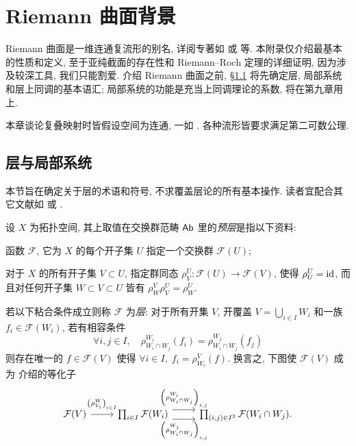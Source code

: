 
\chapter{Riemann 曲面背景}
Riemann 曲面是一维连通复流形的别名, 详阅专著如 \cite{Mei13} 或 \cite[第七章]{ChCh} 等. 本附录仅介绍最基本的性质和定义, 至于亚纯截面的存在性和 Riemann--Roch 定理的详细证明, 因为涉及较深工具, 我们只能割爱. 介绍 Riemann 曲面之前, \S\ref{sec:sheaves} 将先确定层, 局部系统和层上同调的基本语汇; 局部系统的功能是充当上同调理论的系数, 将在第九章用上.

本章谈论复叠映射时皆假设空间为连通, 一如 \cite[第五章]{You}. 各种流形皆要求满足第二可数公理.

\section{层与局部系统}\label{sec:sheaves}
本节旨在确定关于层的术语和符号, 不求覆盖层论的所有基本操作. 读者宜配合其它文献如 \cite[Chapter 2]{Di04} 或 \cite[第 3 章]{LZ}.

\begin{definition}
	设 $X$ 为拓扑空间, 其上取值在交换群范畴 $\mathsf{Ab}$ 里的\emph{预层}是指以下资料:
	\begin{compactitem}
		\item 函数 $\mathcal{F}$, 它为 $X$ 的每个开子集 $U$ 指定一个交换群 $\mathcal{F}(U)$;
		\item 对于 $X$ 的所有开子集 $V \subset U$, 指定群同态 $\rho^U_V: \mathcal{F}(U) \to \mathcal{F}(V)$, 使得 $\rho^U_U = \mathrm{id}$, 而且对任何开子集 $W \subset V \subset U$ 皆有 $\rho^V_W \rho^U_V = \rho^U_W$.
	\end{compactitem}
	若以下粘合条件成立则称 $\mathcal{F}$ 为\emph{层}: 对于所有开集 $V$, 开覆盖 $V = \bigcup_{i \in I} W_i$ 和一族 $f_i \in \mathcal{F}(W_i)$, 若有相容条件
	\[ \forall i, j \in I, \quad \rho^{W_i}_{W_i \cap W_j}(f_i) = \rho^{W_j}_{W_i \cap W_j}(f_j) \]
	则存在唯一的 $f \in \mathcal{F}(V)$ 使得 $\forall i \in I, \; f_i = \rho^V_{W_i}(f)$. 换言之, 下图使 $\mathcal{F}(V)$ 成为 \cite[\S 2.7]{Li1} 介绍的等化子
	\[\begin{tikzcd}
		\mathcal{F}(V) \arrow[r, "{\left(\rho^W_{V_i}\right)_{i \in I}}" inner sep=0.5em] & \prod_{i \in I} \mathcal{F}(W_i) \arrow[r, yshift=0.5em, "{\left( \rho^{W_i}_{W_i \cap W_j} \right)_{i,j}}"] \arrow[r, yshift=-0.5em, "{ \left(\rho^{W_j}_{W_i \cap W_j} \right)_{i,j}}"'] & \prod_{(i, j) \in I^2} \mathcal{F}(W_i \cap W_j) .
	\end{tikzcd}\]
\end{definition}

